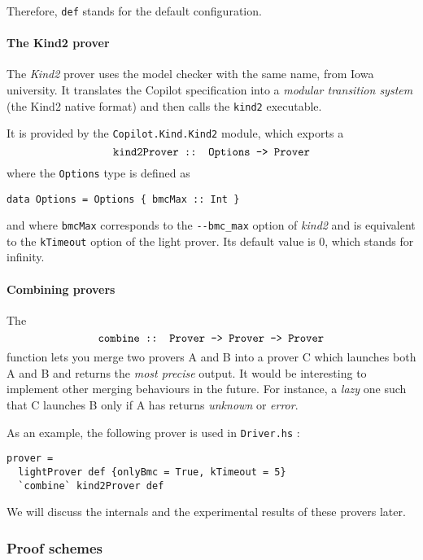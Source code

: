 Therefore, \texttt{def} stands for the default configuration.

\paragraph{The Kind2 prover}\label{the-kind2-prover}

The \emph{Kind2} prover uses the model checker with the same name, from
Iowa university. It translates the Copilot specification into a
\emph{modular transition system} (the Kind2 native format) and then
calls the \texttt{kind2} executable.

It is provided by the \texttt{Copilot.Kind.Kind2} module, which exports
a $$\texttt{kind2Prover :: Options -\textgreater{} Prover}$$ where the
\texttt{Options} type is defined as

\begin{lstlisting}[frame=single]
data Options = Options { bmcMax :: Int }
\end{lstlisting}

and where \texttt{bmcMax} corresponds to the \texttt{-\/-bmc\_max}
option of \emph{kind2} and is equivalent to the \texttt{kTimeout} option
of the light prover. Its default value is 0, which stands for infinity.

\paragraph{Combining provers}\label{combining-provers}

The
$$\texttt{combine :: Prover -\textgreater{} Prover -\textgreater{} Prover}$$
function lets you merge two provers A and B into a prover C which
launches both A and B and returns the \emph{most precise} output. It
would be interesting to implement other merging behaviours in the
future. For instance, a \emph{lazy} one such that C launches B only if A
has returns \emph{unknown} or \emph{error}.

As an example, the following prover is used in \texttt{Driver.hs} :

\begin{lstlisting}[frame=single]
prover =
  lightProver def {onlyBmc = True, kTimeout = 5} 
  `combine` kind2Prover def
\end{lstlisting}

We will discuss the internals and the experimental results of these
provers later.

\subsubsection{Proof schemes}\label{proof-schemes}

